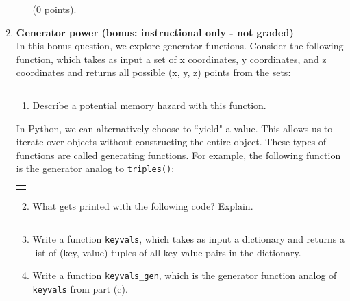 \documentclass{article}
\newcounter{points}
\newcommand\setpoints[1]{\addtocounter{points}{#1}(#1 points)}
\newcommand\printpoints{Total number of points: \value{\thepoints}}
\begin{document}
\begin{enumerate}
\begin{enumerate}
\setpoints{0}.
\end{enumerate}


\item \textbf{Generator power (bonus: instructional only - not graded)} \\
In this bonus question, we explore generator functions.  Consider the following function, which takes as input a set of x coordinates, y coordinates, and z coordinates and returns all possible (x, y, z) points from the sets:

\begin{tabular}{c}

\end{tabular}

\begin{enumerate}
\item
Describe a potential memory hazard with this function.  \\
\end{enumerate}

In Python, we can alternatively choose to ``yield" a value.  This allows us to iterate over objects without constructing the entire object.  These types of functions are called generating functions.  For example, the following function is the generator analog to \texttt{triples()}:

\begin{tabular}{c}
\lstset{morekeywords={yield}}

\end{tabular}

\begin{enumerate}
\setcounter{enumii}{1}
\item
What gets printed with the following code?  Explain. 

\begin{tabular}{c}

\end{tabular}
\end{enumerate}

\begin{enumerate}
\setcounter{enumii}{2}
\item
Write a function \texttt{keyvals}, which takes as input a dictionary and returns a list of (key, value) tuples of all key-value pairs in the dictionary.
\end{enumerate}

\begin{enumerate}
\setcounter{enumii}{3}
\item
Write a function \texttt{keyvals\_gen}, which is the generator function analog of \texttt{keyvals} from part (c).
\end{enumerate}

\end{enumerate}
\end{document}
